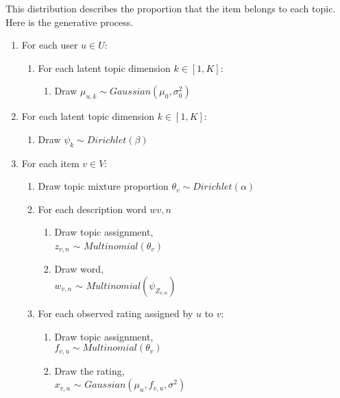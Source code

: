 \documentclass[10pt,conference]{IEEEtran}
\begin{document}
This distribution describes the proportion that the item belongs to each topic. Here is the generative process.

\begin{enumerate}

	\bigskip 
	\item For each user $u \in U$:
		\medskip
		\begin{enumerate}
			\item For each latent topic dimension $k \in [1, K]$:
				\smallskip
				\begin{enumerate}
					\item Draw $\mu_{u,k} \sim Gaussian(\mu_0, \sigma^2_0)$
				\end{enumerate}
		\end{enumerate}
	\bigskip 
	\item For each latent topic dimens​ion $k \in [1, K]:$
		\medskip
		\begin{enumerate}
			\item Draw $\psi_k \sim Dirichlet(\beta)$
			\smallskip
		\end{enumerate}
	\bigskip 
	\item For each item $v \in V$:
		\medskip
		\begin{enumerate}
			\item Draw topic mixture p​roportion $\theta_v \sim Dirichlet(\alpha)$
			\smallskip 
			\item For each description word $w{v,n}$
			\smallskip
			\begin{enumerate}
				\item Draw topic assignment,\\
				\smallskip $z_{v,n}$ $\sim$ $Multinomial(\theta_v)$
				\smallskip
				\item Draw word,\\
				\smallskip $w_{v,n}$ $\sim$ $Multinomial(\psi_{Z_{v,n}})$
				\smallskip
			\end{enumerate}
			\medskip
			\item For each observed rating assigned by $u$ to $v$:
			\begin{enumerate}
				\item Draw topic assignment,\\
				\smallskip $f_{v,u} \sim Multinomial(\theta_v)$
				\smallskip
				\item Draw the rating,\\
				\smallskip $x_{v,u}$ $\sim$ $Gaussian(\mu_u,f_{v,u},\sigma^2)$
				\smallskip
			\end{enumerate}

		\end{enumerate}
	\bigskip 
\end{enumerate}
\end{document}
